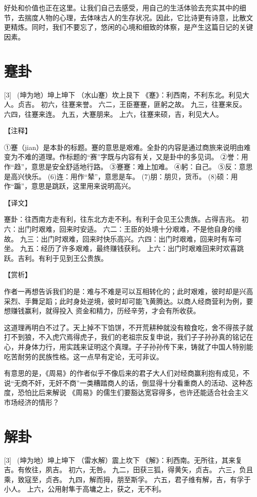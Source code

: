 \documentclass[12pt,UTF8]{ctexbook}
\begin{document}
好处和价值也正在这里。让我们自己去感受，用自己的生活体验去充实其中的细节，去揣度人物的心理，去体味古人的生存状况。因此，它比诗更有诗意，比散文更精炼。同时，我们不要忘了，悠闲的心境和细致的体察，是产生这篇日记的关键因素。

\chapter{蹇卦}
[3] \ (坤为地）坤上坤下
（水山蹇）坎上艮下
《蹇》：利西南，不利东北。利见大人。贞吉。
初六，往蹇来誉。
六二，王臣蹇蹇，匪躬之故。
九三，往蹇来反。
六四，往蹇来连。
九五，大蹇朋来。
上六，往蹇来硕，吉，利见大人。

【注释】

①蹇（jian）是本卦的标题。蹇的意思是艰难。全卦的内容是通过商旅来说明由难变为不难的道理。作标题的“赛”字既与内容有关，又是卦中的多见词。
②誉：用作“趋”，意思是安全舒适地行路。
③蹇蹇：难上加难。
④躬：自己。
⑤反：意思是高兴快乐。
(6)连：用作“辇”，意思是车。
(7)朋：朋贝，货币。
(8)硕：用作“蹁”，意思是跳跃，这里用来说明高兴。

【译文】

蹇卦：往西南方走有利，往东北方走不利。有利于会见王公贵族。占得吉兆。
初六：出门时艰难，回来时安适。
六二：王臣的处境十分艰难，不是他自身的缘故。
九三：出门时艰难，回来时快乐高兴。六四：出门时艰难，回来时有车可坐。
九五：经历了许多艰难，最终赚钱获利。
上六：出门时艰难回来时欢喜跳跃。吉利。有利于见到王公贵族。

【赏析】

作者一再想告诉我们的是：难与不难是可以互相转化的；此时艰难，彼时却是兴高采烈、手舞足蹈；此时身处逆境，彼时却可能飞黄腾达。以商人经商营利为例，要想赚钱赢利，就得投入 资金和精力，历经辛劳，才会有所收获。

这道理再明白不过了。天上掉不下馅饼，不开荒耕种就没有粮食吃，舍不得孩子就打不到狼，不入虎穴焉得虎子，我们的老祖宗反复申说，我们子子孙孙真的铭记在心，并身体力行，用实践来证明这个真理。子子孙孙传下来，铸就了中国人特别能吃苦耐劳的民族性格。这一点早有定论，无可非议。

有意思的是，《周易》的作者似乎不像后来的君子大人们对经商赢利抱有成见，不说“无商不奸，无奸不商”一类糟踏商人的话，倒显得十分看重商人的活动、这种态度，恐怕比后来解说 《周易》的儒生们要豁达宽容得多，也许还能适合社会主义市场经济的情形？

\chapter{解卦}
[3] \ (坤为地）坤上坤下
（雷水解）震上坎下
《解》：利西南。无所往，其来复吉。有攸往，夙吉。
初六，无咎。
九二，田获三狐，得黄矢，贞吉。
六三，负且乘，致寇至，贞吝。
九四，解而拇，朋至斯孚。
六五，君子维有解，吉，有孚于小人。
上六，公用射隼于高墉之上，获之，无不利。
\end{document}
